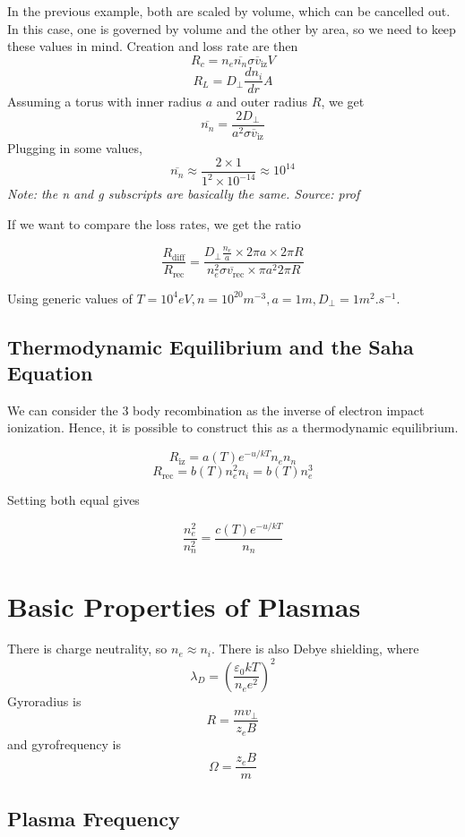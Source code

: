 \documentclass[12pt]{article}
\begin{document}
\begin{ex}
    In the previous example, both are scaled by volume, which can be cancelled out. In this case, one is governed by volume and the other by area, so we need to keep these values in mind. Creation and loss rate are then
    $$R_c = n_e\overline{n_n} \overline{\sigma v_{\text{iz}}}V$$
    $$R_L = D_\perp \frac{dn_i}{dr}A$$
    Assuming a torus with inner radius $a$ and outer radius $R$, we get
    $$\overline{n_n} = \frac{2D_\perp}{a^2\overline{\sigma v_{\text{iz}}}}$$
    Plugging in some values,
    $$\overline{n_n} \approx \frac{2 \times 1}{1^2 \times 10^{-14}} \approx 10^{14}$$
    \textit{Note: the n and g subscripts are basically the same. Source: prof}
\end{ex}

If we want to compare the loss rates, we get the ratio

$$\frac{R_{\text{diff}}}{R_{\text{rec}}} = \frac{D_\perp \frac{n_e}{a} \times 2\pi a \times 2\pi R}{n_e^2 \overline{\sigma v_{\text{rec}}} \times \pi a^2 2\pi R}$$

Using generic values of $T = 10^4\unit{eV}, n = 10^{20} \unit{m^{-3}}, a = 1\unit{m}, D_\perp = 1\unit{m^2.s^{-1}}$.

\subsection{Thermodynamic Equilibrium and the Saha Equation}

We can consider the 3 body recombination as the inverse of electron impact ionization. Hence, it is possible to construct this as a thermodynamic equilibrium.

$$R_{\text{iz}} = a(T)e^{-u/kT}n_en_n$$
$$R_{\text{rec}} = b(T) n_e^2n_i = b(T)n_e^3$$

Setting both equal gives

$$\frac{n_e^2}{n_n^2} = \frac{c(T)e^{-u/kT}}{n_n}$$

\section{Basic Properties of Plasmas}

There is charge neutrality, so $n_e \approx n_i$. There is also Debye shielding, where
$$\lambda_D = \left(\frac{\varepsilon_0kT}{n_ee^2}\right)^2$$
Gyroradius is
$$R = \frac{mv_\perp}{z_eB}$$
and gyrofrequency is
$$\Omega = \frac{z_eB}{m}$$

\subsection{Plasma Frequency}
\end{document}
